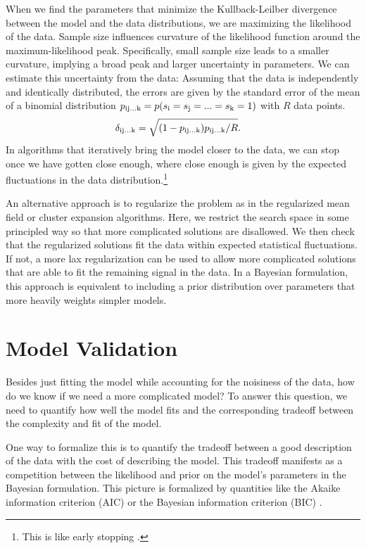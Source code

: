\documentclass[aps,prl,twocolumn,nofootinbib]{revtex4-1}
\begin{document}
When we find the parameters that minimize the Kullback-Leilber divergence between the model and the data distributions, we are maximizing the likelihood of the data. 
Sample size influences curvature of the likelihood function around the maximum-likelihood peak.  Specifically, small sample size leads to a smaller curvature, implying a broad peak and larger uncertainty in parameters.
We can estimate this uncertainty from the data: Assuming that the data is independently and identically distributed, the errors are given by the standard error of the mean of a binomial distribution \mbox{$p_{\rm ij...k} = p(s_{\rm i}=s_{\rm j}=...=s_{\rm k}=1)$} with $R$ data points.
\begin{align}
	\delta_{\rm ij...k} &= \sqrt{(1-p_{\rm ij...k})p_{\rm ij...k}/R}.
\end{align}
In algorithms that iteratively bring the model closer to the data, we can stop once we have gotten close enough, where close enough is given by the expected fluctuations in the data distribution.\footnote{This is like early stopping \cite{}.}

An alternative approach is to regularize the problem as in the regularized mean field or cluster expansion algorithms. Here, we restrict the search space in some principled way so that more complicated
solutions are disallowed.  We then check that the regularized solutions fit the
data within expected statistical fluctuations.  If not, a more lax regularization
can be used to allow more complicated solutions that are able to fit the
remaining signal in the data. 
In a Bayesian formulation, this approach is equivalent to including a prior distribution over  parameters that more heavily weights simpler models.

\section{Model Validation}
Besides just fitting the model while accounting for the noisiness of the data, how do we know if we need a more complicated model? To answer this question, we need to quantify how well the model fits and the corresponding tradeoff between the complexity and fit of the model.

One way to formalize this is to quantify the tradeoff between a good description of the data with the cost of describing the model. This tradeoff manifests as a competition between the likelihood and prior on the model's parameters in the Bayesian formulation.
This picture is formalized by quantities like the Akaike information criterion (AIC) or the Bayesian information criterion (BIC) \cite{Anonymous:mVL3xTtr}.
\end{document}
